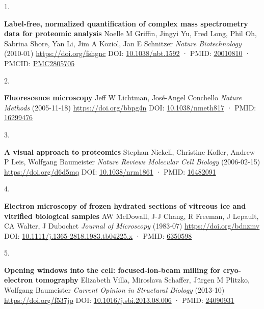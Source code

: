 \documentclass[
]{article}
\newlength{\cslhangindent}
\newlength{\csllabelwidth}
\newlength{\cslentryspacingunit} %
\newenvironment{CSLReferences}[2] %
 {%
  \setlength{\parindent}{0pt}
  \ifodd #1
  \let\oldpar\par
  \def\par{\hangindent=\cslhangindent\oldpar}
  \fi
  \setlength{\parskip}{#2\cslentryspacingunit}
 }%
 {}
\newcommand{\CSLBlock}[1]{#1\hfill\break}
\newcommand{\CSLLeftMargin}[1]{\parbox[t]{\csllabelwidth}{#1}}
\newcommand{\CSLRightInline}[1]{\parbox[t]{\linewidth - \csllabelwidth}{#1}\break}
\begin{document}
\hypertarget{refs}{}
\begin{CSLReferences}{0}{0}
\leavevmode{}%
\CSLLeftMargin{1. }%
\CSLRightInline{\textbf{Label-free, normalized quantification of complex mass spectrometry data for proteomic analysis}
\CSLBlock{Noelle M Griffin, Jingyi Yu, Fred Long, Phil Oh, Sabrina Shore, Yan Li, Jim A Koziol, Jan E Schnitzer} \emph{Nature Biotechnology} (2010-01) \url{https://doi.org/fshgnc}
\CSLBlock{DOI: \href{https://doi.org/10.1038/nbt.1592}{10.1038/nbt.1592} · PMID: \href{https://www.ncbi.nlm.nih.gov/pubmed/20010810}{20010810} · PMCID: \href{https://www.ncbi.nlm.nih.gov/pmc/articles/PMC2805705}{PMC2805705}}}

\leavevmode{}%
\CSLLeftMargin{2. }%
\CSLRightInline{\textbf{Fluorescence microscopy}
\CSLBlock{Jeff W Lichtman, José-Angel Conchello} \emph{Nature Methods} (2005-11-18) \url{https://doi.org/bbpg4n}
\CSLBlock{DOI: \href{https://doi.org/10.1038/nmeth817}{10.1038/nmeth817} · PMID: \href{https://www.ncbi.nlm.nih.gov/pubmed/16299476}{16299476}}}

\leavevmode{}%
\CSLLeftMargin{3. }%
\CSLRightInline{\textbf{A visual approach to proteomics}
\CSLBlock{Stephan Nickell, Christine Kofler, Andrew P Leis, Wolfgang Baumeister} \emph{Nature Reviews Molecular Cell Biology} (2006-02-15) \url{https://doi.org/d6d5mq}
\CSLBlock{DOI: \href{https://doi.org/10.1038/nrm1861}{10.1038/nrm1861} · PMID: \href{https://www.ncbi.nlm.nih.gov/pubmed/16482091}{16482091}}}

\leavevmode{}%
\CSLLeftMargin{4. }%
\CSLRightInline{\textbf{Electron microscopy of frozen hydrated sections of vitreous ice and vitrified biological samples}
\CSLBlock{AW McDowall, J-J Chang, R Freeman, J Lepault, CA Walter, J Dubochet} \emph{Journal of Microscopy} (1983-07) \url{https://doi.org/bdnzmv}
\CSLBlock{DOI: \href{https://doi.org/10.1111/j.1365-2818.1983.tb04225.x}{10.1111/j.1365-2818.1983.tb04225.x} · PMID: \href{https://www.ncbi.nlm.nih.gov/pubmed/6350598}{6350598}}}

\leavevmode{}%
\CSLLeftMargin{5. }%
\CSLRightInline{\textbf{Opening windows into the cell: focused-ion-beam milling for cryo-electron tomography}
\CSLBlock{Elizabeth Villa, Miroslava Schaffer, Jürgen M Plitzko, Wolfgang Baumeister} \emph{Current Opinion in Structural Biology} (2013-10) \url{https://doi.org/f537jp}
\CSLBlock{DOI: \href{https://doi.org/10.1016/j.sbi.2013.08.006}{10.1016/j.sbi.2013.08.006} · PMID: \href{https://www.ncbi.nlm.nih.gov/pubmed/24090931}{24090931}}}


\end{CSLReferences}
\end{document}

